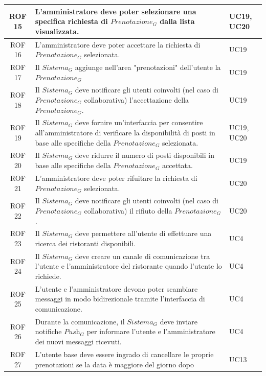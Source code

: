 \documentclass[12pt, oneside]{article}
\begin{document}
\begin{longtable}{|c|p{14cm}|p{2cm}|}
    \hline
    ROF 15 & L'amministratore deve poter selezionare una specifica richiesta di $\textit{Prenotazione}_G$ dalla lista visualizzata. & UC19, UC20 \\
    \hline
    ROF 16 & L'amministratore deve poter accettare la richiesta di $\textit{Prenotazione}_G$ selezionata. & UC19 \\
    \hline
    ROF 17 & Il $\textit{Sistema}_G$ aggiunge nell'area "prenotazioni" dell'utente la $\textit{Prenotazione}_G$ & UC19 \\
    \hline
    ROF 18 & Il $\textit{Sistema}_G$ deve notificare gli utenti coinvolti (nel caso di $\textit{Prenotazione}_G$ collaborativa) l'accettazione della $\textit{Prenotazione}_G$. & UC19 \\
    \hline
    ROF 19 & Il $\textit{Sistema}_G$ deve fornire un'interfaccia per consentire all'amministratore di verificare la disponibilità di posti in base alle specifiche della $\textit{Prenotazione}_G$ selezionata. & UC19, UC20 \\
    \hline
    ROF 20 & Il $\textit{Sistema}_G$ deve ridurre il numero di posti disponibili in base alle specifiche della $\textit{Prenotazione}_G$ accettata. & UC19 \\
    \hline
    ROF 21 & L'amministratore deve poter rifuitare la richiesta di $\textit{Prenotazione}_G$ selezionata. & UC20 \\
    \hline
    ROF 22 & Il $\textit{Sistema}_G$ deve notificare gli utenti coinvolti (nel caso di $\textit{Prenotazione}_G$ collaborativa) il rifiuto della $\textit{Prenotazione}_G$. & UC20 \\
    \hline
    ROF 23 & Il $\textit{Sistema}_G$ deve permettere all'utente di effettuare una ricerca dei ristoranti disponibili. & UC4 \\
    \hline
    ROF 24 & Il $\textit{Sistema}_G$ deve creare un canale di comunicazione tra l'utente e l'amministratore del ristorante quando l'utente lo richiede. & UC4 \\
    \hline
    ROF 25 & L'utente e l'amministratore devono poter scambiare messaggi in modo bidirezionale tramite l'interfaccia di comunicazione. & UC4 \\
    \hline
    ROF 26 & Durante la comunicazione, il $\textit{Sistema}_G$ deve inviare notifiche $\textit{Push}_G$ per informare l'utente e l'amministratore dei nuovi messaggi ricevuti. & UC4 \\
    \hline
    ROF 27 & L'utente base deve essere ingrado di cancellare le proprie prenotazioni se la data è maggiore del giorno dopo & UC13 \\ 

\end{longtable}
\end{document}
